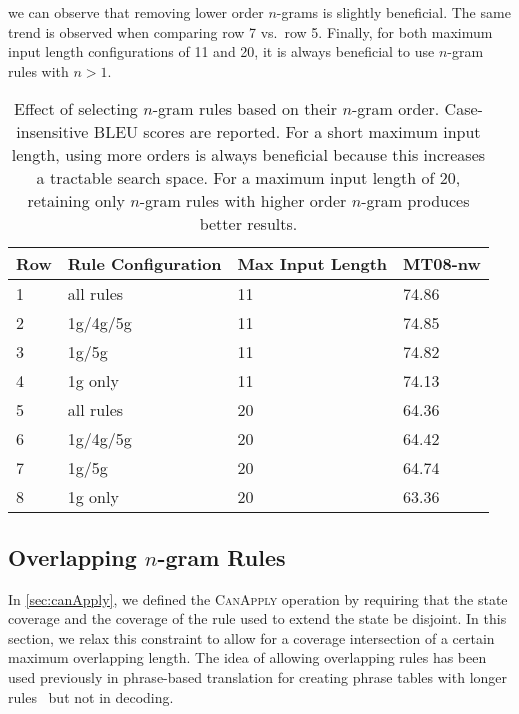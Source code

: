 we can observe that removing lower order $n$-grams is slightly beneficial.
The same trend is observed when comparing row 7 vs.\ row 5.
Finally, for both maximum input length configurations of 11 and 20, it is always
beneficial to use $n$-gram rules with $n > 1$.
%
\begin{table}
  \begin{center}
  \begin{tabular}{l|l|l|l}
    Row & Rule Configuration & Max Input Length & MT08-nw \\
    \hline
    1 & all rules & 11 & 74.86 \\
    2 & 1g/4g/5g & 11 & 74.85 \\
    3 & 1g/5g & 11 & 74.82 \\
    4 & 1g only & 11 & 74.13 \\
    \hline
    5 & all rules & 20 & 64.36 \\
    6 & 1g/4g/5g & 20 & 64.42 \\
    7 & 1g/5g & 20 & 64.74 \\
    8 & 1g only & 20 & 63.36 \\
  \end{tabular}
  \caption{Effect of selecting $n$-gram rules based on their $n$-gram order.
    Case-insensitive BLEU scores are reported.
    For a short maximum input length, using more orders is always beneficial
    because this increases a tractable search space. For a maximum input length
    of 20, retaining only $n$-gram rules with higher order $n$-gram produces
    better results.}
  \label{tab:gyroVaryNgramLength}
  \end{center}
\end{table}

\subsection{Overlapping $n$-gram Rules}
\label{sec:overlap}


In \autoref{sec:canApply}, we defined the \textsc{CanApply}
operation by requiring that the state coverage and the coverage
of the rule used to extend the state be disjoint.
In this section, we relax
this constraint to allow for a coverage intersection
of a certain maximum overlapping length.
The idea of allowing overlapping rules has been used previously
in phrase-based translation for creating phrase tables with
longer rules~\citep{tribble2003overlapping} %
but not in decoding. %

